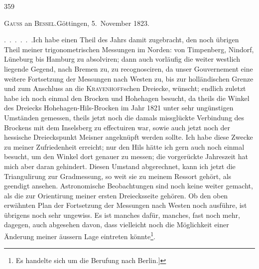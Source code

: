 \par\clearpage
{}\hfill359\par\medskip
\begin{center}
\textsc{Gauss} an \textsc{Bessel}.\quad Göttingen, 5.~November 1823.
\end{center}
\begingroup
\makeatletter
\renewcommand{\@makefnmark}{\hbox{\normalfont[\textsuperscript{*})]}}
\long\def\@makefntext#1{\parindent1.5em\noindent[\textsuperscript{*})\ #1}
\makeatother

\par\noindent\hspace*{\parindent}.\ .\ .\ .\ .\ .\quad Ich habe einen Theil des Jahrs damit zugebracht, den noch übrigen Theil meiner trigonometrischen Messungen im Norden: von Timpenberg, Nindorf, Lüneburg bis Hamburg zu absolviren; dann auch vorläufig die weiter westlich liegende Gegend, nach Bremen zu, zu recognosciren, da unser Gouvernement eine weitere Fortsetzung der Messungen nach Westen zu, bis zur holländischen Grenze und zum Anschluss an die \textsc{Krayenhoff}schen Dreiecke, wünscht; endlich zuletzt habe ich noch einmal den Brocken und Hohehagen besucht, da theils die Winkel des Dreiecks Hohehagen-Hils-Brocken im Jahr 1821 unter sehr ungünstigen Umständen gemessen, theils jetzt noch die damals missglückte Verbindung des Brockens mit dem Inselsberg zu effectuiren war, sowie auch jetzt noch der hessische Dreieckspunkt Meisner angeknüpft werden sollte.
Ich habe diese Zwecke  zu meiner Zufriedenheit erreicht; nur den Hils hätte ich gern auch noch einmal besucht, um den Winkel dort genauer zu messen; die vorgerückte Jahreszeit hat mich aber daran gehindert.
Diesen Umstand abgerechnet, kann ich jetzt die Triangulirung zur Gradmessung, so weit sie zu meinem Ressort gehört, als geendigt ansehen.
Astronomische Beobachtungen sind noch keine weiter gemacht, als die zur Orientirung meiner ersten Dreiecksseite gehören.
Ob  den oben erwähnten Plan der Fortsetzung der Messungen nach Westen noch ausführe, ist übrigens noch sehr ungewiss.
Es ist manches dafür, manches, fast noch mehr, dagegen, auch abgesehen davon, dass vielleicht noch die Möglichkeit einer Änderung meiner äussern Lage eintreten könnte\footnote{Es handelte sich um die Berufung nach Berlin.]}.\par


